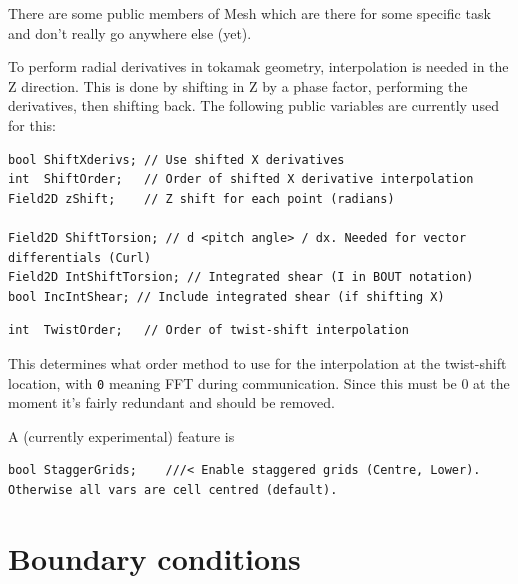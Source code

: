 \documentclass[12pt]{article}
\newcommand{\code}[1]{\texttt{#1}}
\begin{document}
There are some public members of Mesh which are there for some specific
task and don't really go anywhere else (yet). 

To perform radial derivatives in tokamak geometry, interpolation is needed
in the Z direction. This is done by shifting in Z by a phase factor, performing
the derivatives, then shifting back. The following public variables are currently
used for this:
\begin{lstlisting}
bool ShiftXderivs; // Use shifted X derivatives
int  ShiftOrder;   // Order of shifted X derivative interpolation
Field2D zShift;    // Z shift for each point (radians)
  
Field2D ShiftTorsion; // d <pitch angle> / dx. Needed for vector differentials (Curl)
Field2D IntShiftTorsion; // Integrated shear (I in BOUT notation)
bool IncIntShear; // Include integrated shear (if shifting X)
\end{lstlisting}

\begin{lstlisting}
int  TwistOrder;   // Order of twist-shift interpolation
\end{lstlisting}
This determines what order method to use for the interpolation at the twist-shift
location, with \code{0} meaning FFT during communication. Since this must be 0 at the moment
it's fairly redundant and should be removed.

A (currently experimental) feature is 
\begin{lstlisting}
bool StaggerGrids;    ///< Enable staggered grids (Centre, Lower). Otherwise all vars are cell centred (default).
\end{lstlisting}

\section{Boundary conditions}
\label{sec:boundaries}
\end{document}
